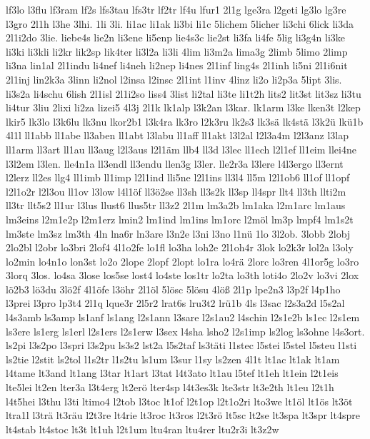 {lf3lo
l3flu
lf3ram
lf2s
lfs3tau
lfs3tr
lf2tr
lf4u
lfur1
2l1g
lge3ra
l2geti
lg3lo
lg3re
l3gro
2l1h
l3he
3lhi.
1li
3li.
li1ac
li1ak
li3bi
li1c
5lichem
5licher
li3chi
6lick
li3da
2l1i2do
3lie.
liebe4s
lie2n
li3ene
li5enp
lie4s3c
lie2st
li3fa
li4fe
5lig
li3g4n
li3ke
li3ki
li3kli
li2kr
lik2sp
lik4ter
li3l2a
li3li
4lim
li3m2a
lima3g
2limb
5limo
2limp
li3na
lin1al
2l1indu
li4nef
li4neh
li2nep
li4nes
2l1inf
ling4s
2l1inh
li5ni
2l1i6nit
2l1inj
lin2k3a
3linn
li2nol
l2insa
l2insc
2l1int
l1inv
4linz
li2o
li2p3a
5lipt
3lis.
li3s2a
li4schu
6lish
2l1isl
2l1i2so
liss4
3list
li2tal
li3te
li1t2h
lits2
lit3st
lit3sz
li3tu
li4tur
3liu
2lixi
li2za
lizei5
4l3j
2l1k
lk1alp
l3k2an
l3kar.
lk1arm
l3ke
lken3t
l2kep
lkir5
lk3lo
l3k6lu
lk3nu
lkor2b1
l3k4ra
lk3ro
l2k3ru
lk2s3
lk3sä
lk4stä
l3k2ü
lkü1b
4l1l
ll1abb
ll1abe
ll3aben
ll1abt
l3labu
ll1aff
ll1akt
l3l2al
l2l3a4m
l2l3anz
l3lap
ll1arm
ll3art
ll1au
ll3aug
l2l3aus
l2l1äm
llb4
ll3d
l3lec
ll1ech
l2l1ef
ll1eim
llei4ne
l3l2em
l3len.
lle4n1a
ll3endl
ll3endu
llen3g
l3ler.
lle2r3a
l3lere
l4l3ergo
ll3ernt
l2lerz
ll2es
llg4
ll1imb
ll1imp
l2l1ind
lli5ne
l2l1ins
ll3l4
ll5m
l2l1ob6
ll1of
ll1opf
l2l1o2r
l2l3ou
ll1ov
l3low
l4l1öf
ll3ö2se
ll3sh
ll3s2k
ll3sp
ll4spr
llt4
ll3th
llti2m
ll3tr
llt5s2
ll1ur
l3lus
llust6
llus5tr
ll3z2
2l1m
lm3a2b
lm1aka
l2m1arc
lm1aus
lm3eins
l2m1e2p
l2m1erz
lmin2
lm1ind
lm1ins
lm1orc
l2möl
lm3p
lmpf4
lm1s2t
lm3ste
lm3sz
lm3th
4ln
lna6r
ln3are
l3n2e
l3ni
l3no
l1nü
1lo
3l2ob.
3lobb
2lobj
2lo2bl
l2obr
lo3bri
2lof4
4l1o2fe
lo1fl
lo3ha
loh2e
2l1oh4r
3lok
lo2k3r
lol2a
l3oly
lo2min
lo4n1o
lon3st
lo2o
2lope
2lopf
2lopt
lo1ra
lo4rä
2lorc
lo3ren
4l1or5g
lo3ro
3lorq
3los.
lo4sa
3lose
los5se
lost4
lo4ste
los1tr
lo2ta
lo3th
loti4o
2lo2v
lo3vi
2lox
lö2b3
lö3du
3lö2f
4l1öfe
l3öhr
2l1öl
5lösc
5lösu
4löß
2l1p
lpe2n3
l3p2f
l4p1ho
l3prei
l3pro
lp3t4
2l1q
lque3r
2l5r2
lrat6s
lru3t2
lrü1b
4ls
l3sac
l2s3a2d
l5s2al
l4s3amb
ls3amp
ls1anf
ls1ang
l2s1ann
l3sare
l2s1au2
l4schin
l2s1e2b
ls1ec
l2s1em
ls3ere
ls1erg
ls1erl
l2s1ers
l2s1erw
l3sex
l4sha
lsho2
l2s1imp
ls2log
ls3ohne
l4s3ort.
ls2pi
l3s2po
l3spri
l3s2pu
ls3s2
lst2a
l5s2taf
ls3täti
l1stec
l5stei
l5stel
l5steu
l1sti
ls2tie
l2stit
ls2tol
l1s2tr
l1s2tu
ls1um
l3sur
l1sy
ls2zen
4l1t
lt1ac
lt1ak
lt1am
l4tame
lt3and
lt1ang
l3tar
lt1art
l3tat
l4t3ato
lt1au
l5tef
lt1eh
lt1ein
l2t1eis
lte5lei
lt2en
lter3a
l3t4erg
lt2erö
lter4sp
l4t3es3k
lte3str
lt3e2th
lt1eu
l2t1h
l4t5hei
l3thu
l3ti
ltimo4
l2tob
l3toc
lt1of
l2t1op
l2t1o2ri
lto3we
lt1öl
lt1ös
lt3öt
ltra1l
l3trä
lt3räu
l2t3re
lt4rie
lt3roc
lt3ros
l2t3rö
lt5sc
lt2se
lt3spa
lt3spr
lt4spre
lt4stab
lt4stoc
lt3t
lt1uh
l2t1um
ltu4ran
ltu4rer
ltu2r3i
lt3z2w
}
